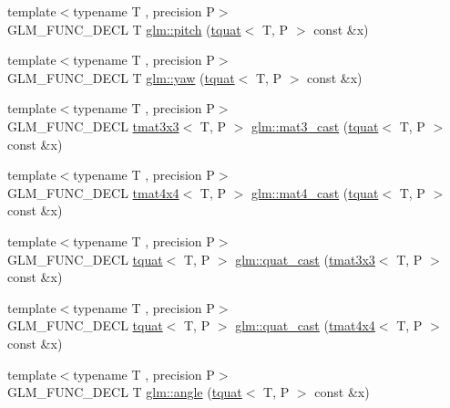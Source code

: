 \begin{DoxyCompactItemize}
\item 
{\footnotesize template$<$typename T , precision P$>$ }\\G\+L\+M\+\_\+\+F\+U\+N\+C\+\_\+\+D\+E\+CL T \hyperlink{group__gtc__quaternion_ga2c08b93a4261c10748fd4d2104346f17}{glm\+::pitch} (\hyperlink{structglm_1_1tquat}{tquat}$<$ T, P $>$ const \&x)
\item 
{\footnotesize template$<$typename T , precision P$>$ }\\G\+L\+M\+\_\+\+F\+U\+N\+C\+\_\+\+D\+E\+CL T \hyperlink{group__gtc__quaternion_ga724a5df282b70cec0a6cb0d6dcddb6d6}{glm\+::yaw} (\hyperlink{structglm_1_1tquat}{tquat}$<$ T, P $>$ const \&x)
\item 
{\footnotesize template$<$typename T , precision P$>$ }\\G\+L\+M\+\_\+\+F\+U\+N\+C\+\_\+\+D\+E\+CL \hyperlink{structglm_1_1tmat3x3}{tmat3x3}$<$ T, P $>$ \hyperlink{group__gtc__quaternion_gae04c39422eb4e450ec8c4f45a1057b40}{glm\+::mat3\+\_\+cast} (\hyperlink{structglm_1_1tquat}{tquat}$<$ T, P $>$ const \&x)
\item 
{\footnotesize template$<$typename T , precision P$>$ }\\G\+L\+M\+\_\+\+F\+U\+N\+C\+\_\+\+D\+E\+CL \hyperlink{structglm_1_1tmat4x4}{tmat4x4}$<$ T, P $>$ \hyperlink{group__gtc__quaternion_ga14bb2ddf028c91542763eb6f2bba47ef}{glm\+::mat4\+\_\+cast} (\hyperlink{structglm_1_1tquat}{tquat}$<$ T, P $>$ const \&x)
\item 
{\footnotesize template$<$typename T , precision P$>$ }\\G\+L\+M\+\_\+\+F\+U\+N\+C\+\_\+\+D\+E\+CL \hyperlink{structglm_1_1tquat}{tquat}$<$ T, P $>$ \hyperlink{group__gtc__quaternion_ga950f8acff3e33bbda77895a3dcb7e5ce}{glm\+::quat\+\_\+cast} (\hyperlink{structglm_1_1tmat3x3}{tmat3x3}$<$ T, P $>$ const \&x)
\item 
{\footnotesize template$<$typename T , precision P$>$ }\\G\+L\+M\+\_\+\+F\+U\+N\+C\+\_\+\+D\+E\+CL \hyperlink{structglm_1_1tquat}{tquat}$<$ T, P $>$ \hyperlink{group__gtc__quaternion_ga3e4615e9884dd0f41f5617b9848a5d9c}{glm\+::quat\+\_\+cast} (\hyperlink{structglm_1_1tmat4x4}{tmat4x4}$<$ T, P $>$ const \&x)
\item 
{\footnotesize template$<$typename T , precision P$>$ }\\G\+L\+M\+\_\+\+F\+U\+N\+C\+\_\+\+D\+E\+CL T \hyperlink{group__gtc__quaternion_gad4a4448baedb198b2b1e7880d2544dc9}{glm\+::angle} (\hyperlink{structglm_1_1tquat}{tquat}$<$ T, P $>$ const \&x)
\item 

\end{DoxyCompactItemize}
